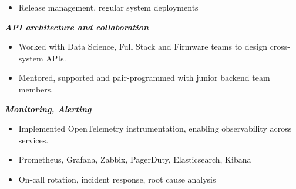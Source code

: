 \documentclass[11pt,a4paper,ngerman,sans]{moderncv}
\begin{document}
{\begin{itemize}
          SOPS, Dhall
    \item Release management, regular system deployments
    \\
  \end{itemize}
	\textbf{\emph{API architecture and collaboration}}
  \begin{itemize}
    \item Worked with Data Science, Full Stack and Firmware teams to design cross-system APIs.
    \item Mentored, supported and pair-programmed with junior backend team members.
    \\
  \end{itemize}
	\textbf{\emph{Monitoring, Alerting}}
  \begin{itemize}
    \item Implemented OpenTelemetry instrumentation, enabling observability across services.
    \item Prometheus, Grafana, Zabbix, PagerDuty, Elasticsearch, Kibana
    \item On-call rotation, incident response, root cause analysis
    \\
  \end{itemize}
}
\end{document}
